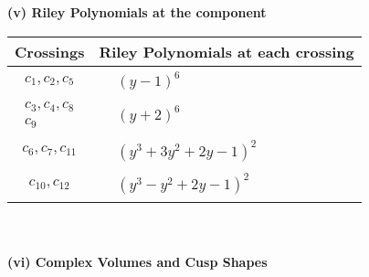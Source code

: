 \documentclass[1p]{elsarticle_modified}
\theoremstyle{definition}
\begin{document}
\newpage\renewcommand{\arraystretch}{1}
\flushleft \textbf{(v) Riley Polynomials at the component}\newline \\
\begin{tabular}{m{50pt}|m{274pt}}
Crossings & \hspace{64pt}Riley Polynomials at each crossing \\
\hline $$\begin{aligned}c_{1},c_{2},c_{5}\end{aligned}$$&$\begin{aligned}
&(y-1)^6
\end{aligned}$\\
\hline $$\begin{aligned}c_{3},c_{4},c_{8}\\c_{9}\end{aligned}$$&$\begin{aligned}
&(y+2)^6
\end{aligned}$\\
\hline $$\begin{aligned}c_{6},c_{7},c_{11}\end{aligned}$$&$\begin{aligned}
&(y^3+3 y^2+2 y-1)^2
\end{aligned}$\\
\hline $$\begin{aligned}c_{10},c_{12}\end{aligned}$$&$\begin{aligned}
&(y^3- y^2+2 y-1)^2
\end{aligned}$\\
\hline
\end{tabular}\\~\\
\newpage\flushleft \textbf{(vi) Complex Volumes and Cusp Shapes}
\end{document}
